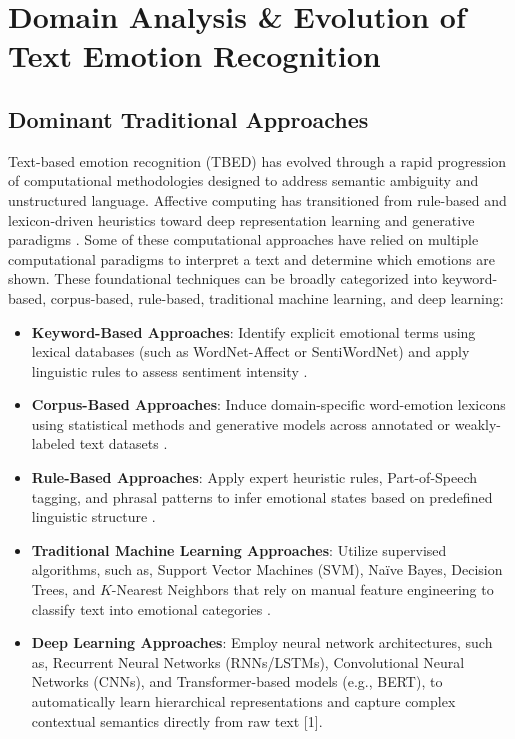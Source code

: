 \documentclass[conference]{IEEEtran}
\begin{document}
\section{Domain Analysis \& Evolution of Text Emotion Recognition}
\label{sec:ejeA}
\subsection{Dominant Traditional Approaches}
Text-based emotion recognition (TBED) has evolved through a rapid progression of computational methodologies designed to address semantic ambiguity and unstructured language. Affective computing has transitioned from rule-based and lexicon-driven heuristics toward deep representation learning and generative paradigms \cite{maruf2024challenges}. 
Some of these computational approaches have relied on multiple computational paradigms to interpret a text and determine which emotions are shown. 
These foundational techniques can be broadly categorized into keyword-based, corpus-based, rule-based, traditional machine learning, and deep learning:

\begin{itemize}
    \item \textbf{Keyword-Based Approaches}: Identify explicit emotional terms using lexical databases (such as WordNet-Affect or SentiWordNet) and apply linguistic rules to assess sentiment intensity \cite{murthy2021review}.
    
    \item \textbf{Corpus-Based Approaches}: Induce domain-specific word-emotion lexicons using statistical methods and generative models across annotated or weakly-labeled text datasets \cite{murthy2021review}.
    
    \item \textbf{Rule-Based Approaches}: Apply expert heuristic rules, Part-of-Speech tagging, and phrasal patterns to infer emotional states based on predefined linguistic structure \cite{murthy2021review}.
    
    \item \textbf{Traditional Machine Learning Approaches}: Utilize supervised algorithms, such as, Support Vector Machines (SVM), Na\"ive Bayes, Decision Trees, and $K$-Nearest Neighbors that rely on manual feature engineering to classify text into emotional categories \cite{murthy2021review}.
    
    \item \textbf{Deep Learning Approaches}: Employ neural network architectures, such as, Recurrent Neural Networks (RNNs/LSTMs), Convolutional Neural Networks (CNNs), and Transformer-based models (e.g., BERT), to automatically learn hierarchical representations and capture complex contextual semantics directly from raw text [1].
\end{itemize}
\end{document}

